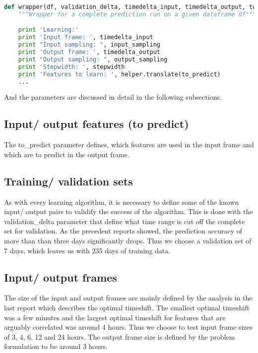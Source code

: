\documentclass{scrartcl}
\begin{document}
\begin{lstlisting}[language=Python]
def wrapper(df, validation_delta, timedelta_input, timedelta_output, to_predict, input_sampling, output_sampling, stepwidth):
    """Wrapper for a complete prediction run on a given dataframe df"""

    print 'Learning:'
    print 'Input frame: ', timedelta_input
    print "Input sampling: ", input_sampling
    print 'Output frame: ', timedelta_output
    print "Output sampling: ", output_sampling
    print 'Stepwidth: ', stepwidth
    print 'Features to learn: ', helper.translate(to_predict)
    ...
\end{lstlisting}

And the parameters are discussed in detail in the following subsections.


\subsection{Input/ output features (to predict)}
\label{sec:}
The to\_predict parameter defines, which features are used in the input frame and which are to predict in the output frame.


\subsection{Training/ validation sets}
\label{sec:}
As with every learning algorithm, it is necessary to define some of the known input/ output pairs to validify the success of the algorithm. This is done with the validation\_delta parameter that define what time range is cut off the complete set for validation. As the precedent reports showed, the prediction accuracy of more than than three days significantly drops. Thus we choose a validation set of 7 days, which leaves us with 235 days of training data.

\subsection{Input/ output frames}
\label{sec:}
The size of the input and output frames are mainly defined by the analysis in the last report which describes the optimal timeshift. The smallest optimal timeshift was a few minutes and the largest optimal timeshift for features that are arguably correlated was around 4 hours. Thus we choose to test input frame sizes of 3, 4, 6, 12 and 24 hours. The output frame size is defined by the problem formulation to be around 3 hours. 
\end{document}
